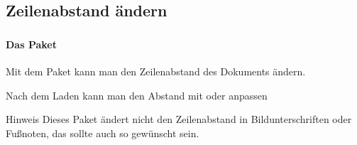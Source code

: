 \subsection{Zeilenabstand ändern}

\begin{frame}
    \frametitle{\subsecname}
    \framesubtitle{Das Paket }
    
    Mit dem Paket  kann man den Zeilenabstand des Dokuments ändern.

    \bigskip    
    Nach dem Laden kann man den Abstand mit  oder
     anpassen
    
    \bigskip
    \begin{block}{Hinweis}
        Dieses Paket ändert nicht den Zeilenabstand in Bildunterschriften oder
        Fußnoten, das sollte auch so gewünscht sein.
    \end{block}
\end{frame}